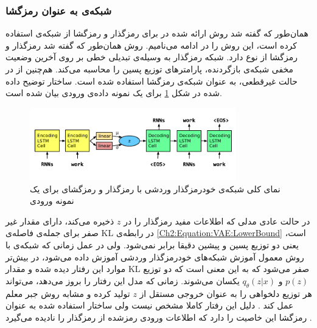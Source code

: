 \subsubsection{شبکه‌ی  به عنوان رمزگشا}
همان‌طور که گفته شد روش ارائه شده در
  \cite{Bowman2016VAE}
برای رمزگذار  و رمزگشا از شبکه‌ی
استفاده کرده است، این روش را در ادامه
می‌نامیم.
\newline
روش 
همان‌طور که گفته شد رمزگذار و رمزگشا از نوع 
دارد.
شبکه رمزگذار به وسیله‌ی تبدیلی خطی بر روی آخرین وضعیت مخفی شبکه‌ی بازگردنده، پارامترهای توزیع پسین را محاسبه می‌کند.
هم‌چنین از
در حالت غیرقطعی، به عنوان شبکه‌ی رمزگشا استفاده شده است.
 ساختار توضیح داده شده در شکل
 \ref{Figure:VAE:Architecture}
 برای یک نمونه داده‌ی ورودی بیان شده است.
\begin{figure}[!htb]
	\centering
	\includegraphics[width=0.8\textwidth]{images/ArchitectureVAE.pdf} 
	\caption[نمای کلی شبکه‌ی خودرمزگذار وردشی با رمزگذار و رمزگشای
	برای یک نمونه ورودی]
	{
		نمای کلی شبکه‌ی خودرمزگذار وردشی با رمزگذار و رمزگشای
		برای یک نمونه ورودی
		\cite{Bowman2016VAE}
	}
	\label{Figure:VAE:Architecture}
\end{figure}
 \newline
در حالت عادی مدلی که اطلاعات مفید رمزگذار را در 
 $z$
 ذخیره می‌کند، دارای مقدار غیر صفر برای جمله‌ی فاصله‌ی KL در رابطه‌ی 
\ref{Ch2:Equation:VAE:LowerBound}
 است، یعنی دو توزیع پسین و پیشین  دقیقا برابر نمی‌شود. 
 ولی در عمل زمانی که شبکه‌ی
 با روش معمول آموزش شبکه‌های خودرمزگذار وردشی آموزش داده می‌شود، در بیش‌تر موارد این رفتار دیده شده و مقدار KL صفر می‌شود که به این معنی است که دو توزیع
 $p(z)$
 و
 $q_{\theta}(z|x)$
 یکسان می‌شوند. زمانی که مدل این رفتار را بروز می‌دهد، می‌تواند هر توزیع دلخواهی را به عنوان خروجی مستقل از
 $z$
 تولید کرده و مشابه روش جبر معلم عمل کند 
 \cite{Bowman2016VAE}.
   دلیل این رفتار کاملا مشخص نیست ولی  ساختار
   استفاده شده به عنوان  رمزگشا این خاصیت را دارد که اطلاعات ورودی رمزشده از رمزگذار را نادیده می‌گیرد
   \cite{Yang2017ImprovedVAE, Bowman2016VAE}.
 \newline
